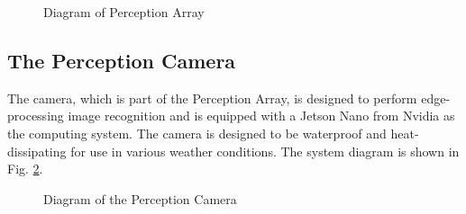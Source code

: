 \documentclass[lettersize,journal]{IEEEtran}
\begin{document}
\begin{figure}[H]
  \begin{center}
  \end{center}
  \caption{Diagram of Perception Array}
  \label{fig:perception_aray_diagram}
\end{figure}

\subsection{The Perception Camera}

The camera, which is part of the Perception Array, is designed to perform edge-processing image recognition and is equipped with a Jetson Nano from Nvidia as the computing system.
The camera is designed to be waterproof and heat-dissipating for use in various weather conditions.
The system diagram is shown in Fig. \ref{fig:perception_camera_diagram}.

\begin{figure}[htbp]
  \begin{center}
  \end{center}
  \caption{Diagram of the Perception Camera}
  \label{fig:perception_camera_diagram}
\end{figure}
\end{document}
